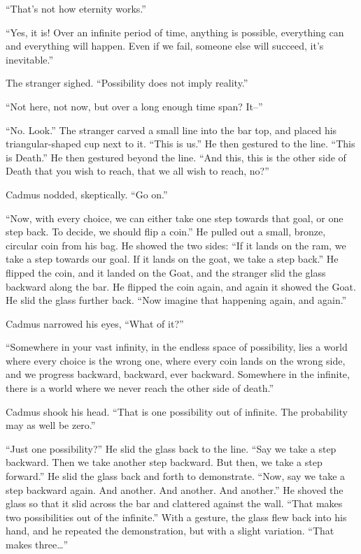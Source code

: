 “That’s not how eternity works.”

“Yes, it is! Over an infinite period of time, anything is possible, everything can and everything will happen. Even if we fail, someone else will succeed, it’s inevitable.”

The stranger sighed. “Possibility does not imply reality.”

“Not here, not now, but over a long enough time span? It–”

“No. Look.” The stranger carved a small line into the bar top, and placed his triangular-shaped cup next to it. “This is us.” He then gestured to the line. “This is Death.” He then gestured beyond the line. “And this, this is the other side of Death that you wish to reach, that we all wish to reach, no?”

Cadmus nodded, skeptically. “Go on.”

“Now, with every choice, we can either take one step towards that goal, or one step back. To decide, we should flip a coin.” He pulled out a small, bronze, circular coin from his bag. He showed the two sides: “If it lands on the ram, we take a step towards our goal. If it lands on the goat, we take a step back.” He flipped the coin, and it landed on the Goat, and the stranger slid the glass backward along the bar. He flipped the coin again, and again it showed the Goat. He slid the glass further back. “Now imagine that happening again, and again.”

Cadmus narrowed his eyes, “What of it?”

“Somewhere in your vast infinity, in the endless space of possibility, lies a world where every choice is the wrong one, where every coin lands on the wrong side, and we progress backward, backward, ever backward. Somewhere in the infinite, there is a world where we never reach the other side of death.”

Cadmus shook his head. “That is one possibility out of infinite. The probability may as well be zero.”

“Just one possibility?” He slid the glass back to the line. “Say we take a step backward. Then we take another step backward. But then, we take a step forward.” He slid the glass back and forth to demonstrate. “Now, say we take a step backward again. And another. And another. And another.” He shoved the glass so that it slid across the bar and clattered against the wall. “That makes two possibilities out of the infinite.” With a gesture, the glass flew back into his hand, and he repeated the demonstration, but with a slight variation. “That makes three…”

